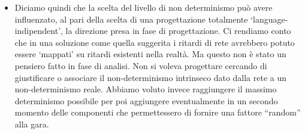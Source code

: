 \begin{itemize}
 \item Diciamo quindi che la scelta del livello di non determinismo può avere influenzato, al pari della scelta di una progettazione totalmente ‘language-indipendent’, la direzione presa in fase di progettazione. Ci rendiamo conto che in una soluzione come quella suggerita i ritardi di rete avrebbero potuto essere ‘mappati’ su ritardi esistenti nella realtà. Ma questo non è stato un pensiero fatto in fase di analisi. Non si voleva progettare cercando di giustificare o associare il non-determinismo intrinseco dato dalla rete a un non-determinismo reale. Abbiamo voluto invece raggiungere il massimo determinismo possibile per poi aggiungere eventualmente in un secondo momento delle componenti che permettessero di fornire una fattore “random” alla gara.
 \end{itemize}